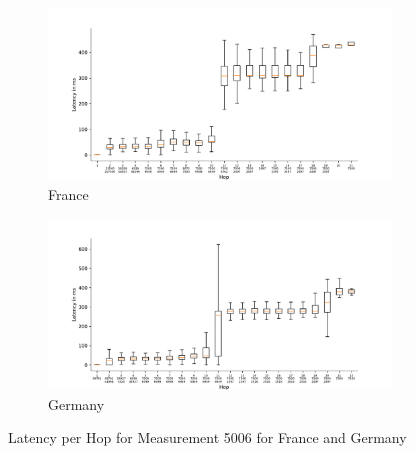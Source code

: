 \begin{figure}
	\centering
	\begin{subfigure}[b]{\linewidth}
		\includegraphics[width=\linewidth]{chapters/4-results/traceroute/img/latency-per-hop-FR-5006.pdf}
		\caption{France}
	\end{subfigure}
	\begin{subfigure}[b]{\linewidth}
		\includegraphics[width=\linewidth]{chapters/4-results/traceroute/img/latency-per-hop-DE-5006.pdf}
		\caption{Germany}
	\end{subfigure}
	\caption{Latency per Hop for Measurement 5006 for France and Germany}
	\label{fig:latency-change-per-hop-appendix-6}
\end{figure}


